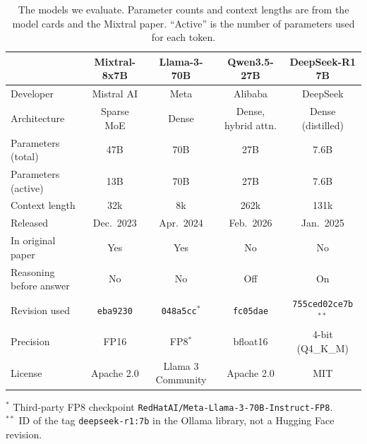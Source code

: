 \begin{table}[H]
  \centering
  \small
  \caption{The models we evaluate. Parameter counts and context lengths are
  from the model cards and the Mixtral paper. ``Active'' is the number of
  parameters used for each token.}
  \label{tab:models}
  \setlength{\tabcolsep}{4pt}
  \begin{tabular}{lcccc}
    \toprule
     & Mixtral-8x7B & Llama-3-70B & Qwen3.5-27B & DeepSeek-R1 7B \\
    \midrule
    Developer            & Mistral AI  & Meta              & Alibaba              & DeepSeek \\
    Architecture         & Sparse MoE  & Dense             & Dense, hybrid attn.  & Dense (distilled) \\
    Parameters (total)   & 47B         & 70B               & 27B                  & 7.6B \\
    Parameters (active)  & 13B         & 70B               & 27B                  & 7.6B \\
    Context length       & 32k         & 8k                & 262k                 & 131k \\
    Released             & Dec.\ 2023  & Apr.\ 2024        & Feb.\ 2026           & Jan.\ 2025 \\
    In original paper    & Yes         & Yes               & No                   & No \\
    Reasoning before answer & No       & No                & Off                  & On \\

    Revision used        & \texttt{eba9230} & \texttt{048a5cc}$^{*}$ & \texttt{fc05dae} & \texttt{755ced02ce7b}$^{**}$ \\
    
    Precision            & FP16             & FP8$^{*}$ & bfloat16         & 4-bit (Q4\_K\_M) \\

    License              & Apache 2.0  & Llama 3 Community & Apache 2.0           & MIT \\
    \bottomrule
  \end{tabular}

  \vspace{2pt}
  \raggedright\footnotesize
  $^{*}$ Third-party FP8 checkpoint \texttt{RedHatAI/Meta-Llama-3-70B-Instruct-FP8}.
  \\$^{**}$ ID of the tag \texttt{deepseek-r1:7b} in the Ollama library, not a Hugging Face revision.
\end{table}

